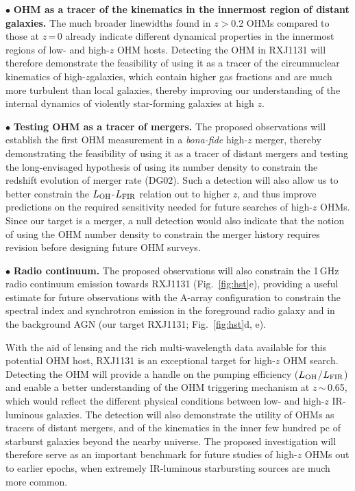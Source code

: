 \documentclass[letterpaper,11pt]{article}
\newcommand{\LFIR}{\mbox{$L_{\rm FIR}$}\xspace}
\newcommand{\LOH}{$L_{\rm OH}$\xspace}
\newcommand{\Fig}[1]{Fig.~\ref{fig:#1}}
\newcommand{\eq}{\,=\,}
\newcommand{\ssim}{\,$\sim$\,}
\newcommand{\highz}{high-$z$\space}
\newcommand{\obs}{observations\xspace}
\begin{document}
\noindent $\bullet$ {\bf OHM as a tracer of the kinematics in the innermost region of distant galaxies.}
The much broader linewidths found in $z$$>$0.2 OHMs \citep[typically at least a factor of $>$2 in FWHM;][DG02]{Baan92a}
compared to those at $z$\eq0 already indicate
different dynamical properties in the innermost regions of low- and high-$z$ OHM hosts.
Detecting the OHM in RXJ1131 will therefore demonstrate the feasibility of
using it as a tracer of the circumnuclear kinematics of \highz galaxies, which contain higher 
gas fractions and are much more turbulent than local galaxies, thereby improving
our understanding of the internal dynamics of violently star-forming galaxies at high $z$.

\noindent $\bullet$ {\bf Testing OHM as a tracer of mergers.}
The proposed \obs will establish the first OHM measurement in a {\it bona-fide} high-$z$ merger, thereby
demonstrating the feasibility of using it as a tracer of distant mergers and
testing the long-envisaged hypothesis of using its number density to constrain
the redshift evolution of merger rate (DG02).
Such a detection will also allow us to better constrain the
\LOH-\LFIR relation out to higher $z$, %
and thus improve predictions on the required sensitivity needed for future searches of high-$z$ OHMs.
Since our target is a merger,
a null detection would also indicate that the notion of
using the OHM number density to constrain the merger history requires revision before designing future OHM surveys.

\noindent $\bullet$ {\bf Radio continuum.}
The proposed \obs will also constrain the 1\,GHz radio continuum emission
towards RXJ1131 (\Fig{hst}e), providing a useful estimate for future observations with the A-array configuration to
constrain the spectral index and synchrotron emission in the foreground radio galaxy 
and in the background AGN (our target RXJ1131; \Fig{hst}d, e).

\noindent
With the aid of lensing and the rich multi-wavelength data available for this potential OHM host, RXJ1131 is an exceptional target
for high-$z$ OHM search. 
Detecting the OHM will provide a handle on the pumping efficiency (\LOH/\LFIR)
and enable a better understanding of the OHM triggering mechanism at $z$\ssim0.65, which
would reflect the different physical conditions between low- and high-$z$ IR-luminous galaxies.
The detection will also demonstrate the utility of OHMs as tracers of distant mergers, and
of the kinematics in the inner few hundred pc
of starburst galaxies beyond the nearby universe. %
The proposed investigation will therefore serve as an
important benchmark for future studies of high-$z$ OHMs out to earlier epochs,
when extremely IR-luminous starbursting sources are much more common.
\end{document}
